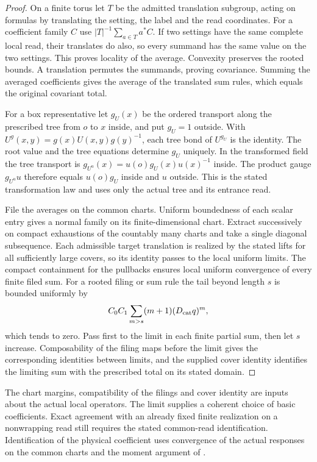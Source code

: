 \documentclass[11pt,letterpaper,reqno]{amsart}
\numberwithin{equation}{section}
\theoremstyle{definition}
\theoremstyle{remark}
\begin{document}
\begin{proof}
On a finite torus let $T$ be the admitted translation subgroup, acting on formulas
by translating the setting, the label and the read coordinates. For
a coefficient family $C$ use $|T|^{-1}\sum_{a\in T}a^*C$. If two
settings have the same complete local read, their translates do also,
so every summand has the same value on the two settings. This proves
locality of the average. Convexity preserves the rooted bounds. A
translation permutes the summands, proving covariance. Summing the
averaged coefficients gives the average of the translated sum rules,
which equals the original covariant total.

For a box representative let $g_U(x)$ be the ordered transport along
the prescribed tree from $o$ to $x$ inside, and put $g_U=1$ outside.
With $U^g(x,y)=g(x)U(x,y)g(y)^{-1}$, each tree bond of $U^{g_U}$
is the identity. The root value and the tree equations determine
$g_U$ uniquely. In the transformed field the tree transport is
$g_{U^u}(x)=u(o)g_U(x)u(x)^{-1}$ inside. The product gauge
$g_{U^u}u$ therefore equals $u(o)g_U$ inside and $u$ outside.
This is the stated transformation law and uses only the actual tree
and its entrance read.

File the averages on the common charts. Uniform boundedness of each
scalar entry gives a normal family on its finite-dimensional chart.
Extract successively on compact exhaustions of the countably many
charts and take a single diagonal subsequence. Each admissible target
translation is realized by the stated lifts for all sufficiently large
covers, so its identity passes to the local uniform limits. The
compact containment for the pullbacks ensures local uniform
convergence of every finite filed sum. For a rooted filing or
sum rule the tail beyond length $s$ is bounded uniformly by
\[
  C_0C_1\sum_{m>s}(m+1)(D_{\rm cat}q)^m,
\]
which tends to zero. Pass first to the limit in each finite partial
sum, then let $s$ increase. Composability of the filing maps before
the limit gives the corresponding identities between limits, and the
supplied cover identity identifies the limiting sum with the
prescribed total on its stated domain.
\end{proof}

The chart margins, compatibility of the filings and cover identity
are inputs about the actual local operators. The limit supplies a
coherent choice of basic coefficients. Exact agreement with an
already fixed finite realization on a nonwrapping read still requires
the stated common-read identification. Identification of the physical
coefficient uses convergence of the actual responses on the common
charts and the moment argument of \cite[Proposition~6.3]{EM}.
\end{document}
